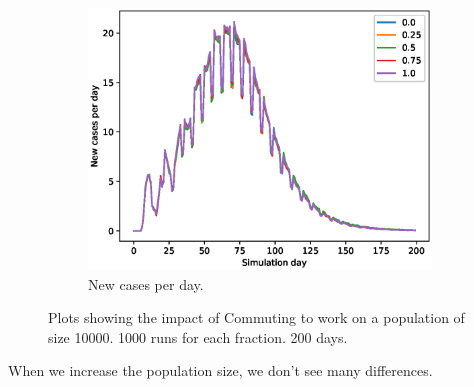 \documentclass[runningheads]{llncs}
\begin{document}
\begin{figure}[h!]
	\centering
	\begin{subfigure}[b]{0.7\linewidth}
		\includegraphics[width=\textwidth]{work_cases_per_day_3.eps}
		\caption{New cases per day.} 
	\end{subfigure}
	\caption{Plots showing the impact of Commuting to work on a population of size 10000. 1000 runs for each fraction. 200 days.}
	\label{VaccinePlot}
\end{figure}

\newpage
When we increase the population size, we don't see many differences. 
\end{document}
